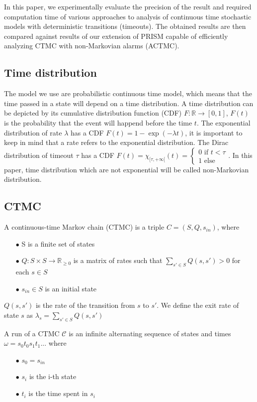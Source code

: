 \documentclass[runningheads,custombib]{llncs}
\begin{document}
	In this paper, we experimentally evaluate the precision of the result and required computation time of various approaches to analysis of continuous time stochastic models with deterministic transitions (timeouts). The obtained results are then compared against results of our extension of PRISM capable of efficiently analyzing CTMC with non-Markovian alarms (ACTMC).
	
	
\subsection{Time distribution}
The model we use are probabilistic continuous time model, which means that the time passed in a state will depend on a time distribution. A time distribution can be depicted by its cumulative distribution function (CDF) $F : \mathbb{R} \rightarrow[0,1]$, $F(t)$ is the probability that the event will happend before the time $t$. The exponential distribution of rate $\lambda$ has a CDF $F(t) = 1 - \exp(-\lambda t)$, it is important to keep in mind that a rate refers to the exponential distribution. The Dirac distribution of timeout $\tau$ has a CDF $F(t) = \chi_{[\tau,+\infty[}(t) = 
\left\{
	\begin{array}{l}
		0 \text{ if } t < \tau\\
		1\text{ else}
	\end{array}
\right.$. In this paper, time distribution which are not exponential will be called non-Markovian distribution.
\subsection{CTMC}
A continuous-time Markov chain (CTMC) is a triple $C = (S,Q,s_{in})$, where 
\begin{itemize}
	\item[$\bullet$] S is a finite set of states
	\item[$\bullet$] $Q : S \times S \rightarrow \mathbb{R}_{\geq 0}$ is a matrix of rates such that $\sum_{s' \in S} Q(s,s')  > 0$ for each $s \in S$
	\item[$\bullet$] $s_{in} \in S$ is an initial state
\end{itemize} 
$Q(s,s')$ is the rate of the transition from $s$ to $s'$.
We define the exit rate of state $s$ as $\lambda_s = \sum_{s' \in S} Q(s,s')$

A run of a CTMC $\mathcal{C}$ is an infinite alternating sequence of states and times $\omega = s_0t_0s_1t_1...$ where 
\begin{itemize}
	\item[$\bullet$] $s_0 = s_{in}$
	\item[$\bullet$] $s_i$ is the i-th state
	\item[$\bullet$] $t_i$ is the time spent in $s_i$
\end{itemize}
\end{document}
